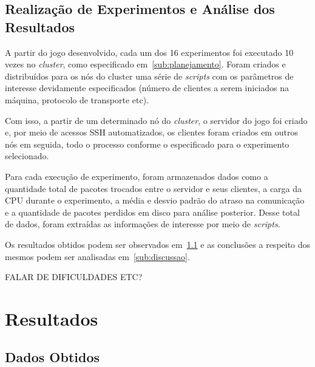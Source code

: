 \documentclass[12pt]{article}
\begin{document}
\subsection{Realização de Experimentos e Análise dos Resultados} \label{sub:realizacao}

A partir do jogo desenvolvido, cada um dos 16 experimentos foi executado 10
vezes no \textit{cluster}, como especificado em~\ref{sub:planejamento}. Foram
criados e distribuídos para os nós do cluster uma série de \textit{scripts}
com os parâmetros de interesse devidamente especificados (número de clientes a
serem iniciados na máquina, protocolo de transporte etc).

Com isso, a partir de um determinado nó do \textit{cluster}, o servidor do jogo
foi criado e, por meio de acessos SSH automatizados, os clientes foram criados
em outros nós em seguida, todo o processo conforme o especificado para o
experimento selecionado.

Para cada execução de experimento, foram armazenados dados como a quantidade
total de pacotes trocados entre o servidor e seus clientes, a carga da CPU
durante o experimento, a média e desvio padrão do atraso na comunicação e a
quantidade de pacotes perdidos em disco para análise posterior. Desse total de
dados, foram extraídas as informações de interesse por meio de
\textit{scripts}.

Os resultados obtidos podem ser observados em~\ref{sub:dados} e as conclusões a
respeito dos mesmos podem ser analisadas em~\ref{sub:discussao}.

FALAR DE DIFICULDADES ETC?

\section{Resultados} \label{sec:resultados}
\subsection{Dados Obtidos} \label{sub:dados}
\end{document}
